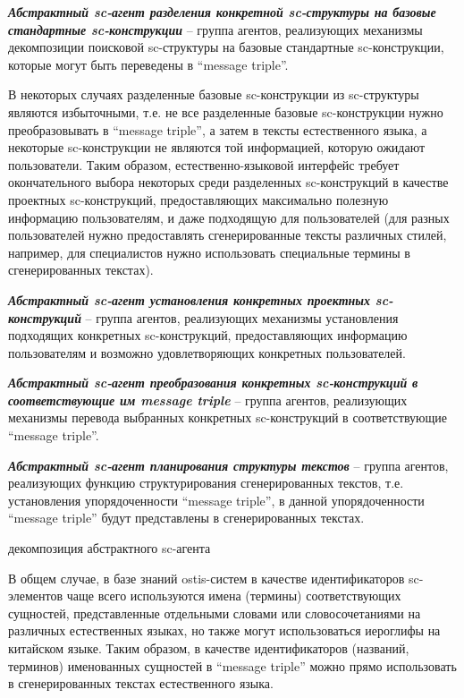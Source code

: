 \textit{\textbf{Абстрактный sc-агент разделения конкретной sc-структуры на базовые стандартные sc-конструкции}} -- группа агентов, реализующих механизмы декомпозиции поисковой sc-структуры на базовые стандартные sc-конструкции, которые могут быть переведены в ``message triple''. 

В некоторых случаях разделенные базовые sc-конструкции из sc-структуры являются избыточными, т.е. не все разделенные базовые sc-конструкции нужно преобразовывать в ``message triple'', а затем в тексты естественного языка, а некоторые sc-конструкции не являются той информацией, которую ожидают пользователи. Таким образом, естественно-языковой интерфейс требует окончательного выбора некоторых среди разделенных sc-конструкций в качестве проектных sc-конструкций, предоставляющих максимально полезную информацию пользователям, и даже подходящую для пользователей (для разных пользователей нужно предоставлять сгенерированные тексты различных стилей, например, для специалистов нужно использовать специальные термины в сгенерированных текстах). 

\textit{\textbf{Абстрактный sc-агент установления конкретных проектных sc-конструкций}} -- группа агентов, реализующих механизмы установления подходящих конкретных sc-конструкций, предоставляющих информацию пользователям и возможно удовлетворяющих конкретных пользователей. 

\textit{\textbf{Абстрактный sc-агент преобразования конкретных sc-конструкций в соответствующие им message triple}} -- группа агентов, реализующих механизмы перевода выбранных конкретных sc-конструкций в соответствующие ``message triple''.

\textit{\textbf{Абстрактный sc-агент планирования структуры текстов}} -- группа агентов, реализующих функцию структурирования сгенерированных текстов, т.е. установления упорядоченности ``message triple'', в данной упорядоченности ``message triple'' будут представлены в сгенерированных текстах. 
\begin{SCn}
	\begin{scnrelfromset}{декомпозиция абстрактного sc-агента}
	\end{scnrelfromset}
\end{SCn}

В общем случае, в базе знаний ostis-систем в качестве идентификаторов sc-элементов чаще всего используются имена (термины) соответствующих сущностей, представленные отдельными словами или словосочетаниями на различных естественных языках, но также могут использоваться иероглифы на китайском языке. Таким образом, в качестве идентификаторов (названий, терминов) именованных сущностей в ``message triple'' можно прямо использовать в сгенерированных текстах естественного языка. 

